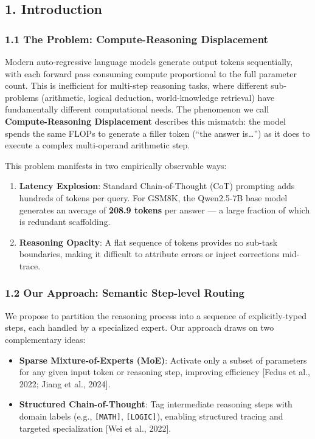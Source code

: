 \subsection{1. Introduction}\label{introduction}

\subsubsection{1.1 The Problem: Compute-Reasoning
Displacement}\label{the-problem-compute-reasoning-displacement}

Modern auto-regressive language models generate output tokens
sequentially, with each forward pass consuming compute proportional to
the full parameter count. This is inefficient for multi-step reasoning
tasks, where different sub-problems (arithmetic, logical deduction,
world-knowledge retrieval) have fundamentally different computational
needs. The phenomenon we call \textbf{Compute-Reasoning Displacement}
describes this mismatch: the model spends the same FLOPs to generate a
filler token (``the answer is\ldots{}'') as it does to execute a complex
multi-operand arithmetic step.

This problem manifests in two empirically observable ways:

\begin{enumerate}
\def\labelenumi{\arabic{enumi}.}
\tightlist
\item
  \textbf{Latency Explosion}: Standard Chain-of-Thought (CoT) prompting
  adds hundreds of tokens per query. For GSM8K, the Qwen2.5-7B base
  model generates an average of \textbf{208.9 tokens} per answer --- a
  large fraction of which is redundant scaffolding.
\item
  \textbf{Reasoning Opacity}: A flat sequence of tokens provides no
  sub-task boundaries, making it difficult to attribute errors or inject
  corrections mid-trace.
\end{enumerate}

\subsubsection{1.2 Our Approach: Semantic Step-level
Routing}\label{our-approach-semantic-step-level-routing}

We propose to partition the reasoning process into a sequence of
explicitly-typed steps, each handled by a specialized expert. Our
approach draws on two complementary ideas:

\begin{itemize}
\tightlist
\item
  \textbf{Sparse Mixture-of-Experts (MoE)}: Activate only a subset of
  parameters for any given input token or reasoning step, improving
  efficiency {[}Fedus et al., 2022; Jiang et al., 2024{]}.
\item
  \textbf{Structured Chain-of-Thought}: Tag intermediate reasoning steps
  with domain labels (e.g., \texttt{{[}MATH{]}}, \texttt{{[}LOGIC{]}}),
  enabling structured tracing and targeted specialization {[}Wei et al.,
  2022{]}.
\end{itemize}

